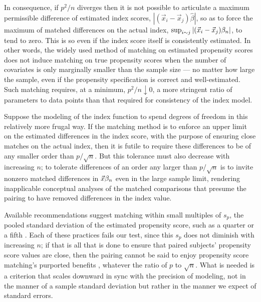 \documentclass{article}
\theoremstyle{remark}
\begin{document}
In consequence, if $p^2/n$ diverges then it is not possible to
articulate a maximum permissible difference of estimated
index scores, $|(\vec{x}_i - \vec{x}_j)\hat\beta|$, so as to force
the maximum of matched differences on the actual index,
$\sup_{i \sim j}|(\vec{x}_i - \vec{x}_j)\beta_{n }|$, to tend to zero. This
is so even if the index score itself is consistently estimated.
In other words, the widely used method of matching on estimated
propensity scores does not induce matching on true propensity scores
when the number of covariates is only marginally smaller than the sample
size --- no matter how large the sample, even if the propensity
specification is correct and well-estimated. Such matching requires, at
a minimum, $p^2/n \downarrow 0$, a more stringent ratio of
parameters to data points than that required for consistency of the
index model.

Suppose the modeling of the index function to spend degrees of freedom in this
relatively more frugal way. If the matching method is to enforce an
upper limit on the estimated differences in the index score, with the purpose of ensuring
close matches on the actual index, then it is futile to require
these differences to be of any smaller order than $p/\sqrt{n}$.  But
this tolerance must also decrease with increasing $n$; to tolerate differences of an order any larger than
$p/\sqrt{n}$ is to invite nonzero matched differences in $\vec{x}\beta_{n }$ even
in the large sample limit, rendering inapplicable conceptual analyses
of the matched comparisons that presume the pairing to have removed
differences in the index value. 

Available recommendations suggest matching within small multiples of
$s_{p}$, the pooled standard deviation of the estimated propensity
score, such as a quarter \citep{rosenbaum:rubi:1985a,rubin:thom:2000}
or a fifth \citep{austin2011optimal,wang2013PScalipers3groups}.  Each
of these practices fails our test, since this $s_{p}$ does not
diminish with increasing $n$; if that is all that is done to ensure
that paired subjects' propensity score values are close, then the
pairing cannot be said to enjoy propensity score matching's purported
benefits \citep{rosenbaum:rubi:1983}, whatever the ratio of $p$ to
$\sqrt{n}$.  What is needed is a criterion that scales downward in
sync with the precision of modeling, not in the manner of a sample
standard deviation but rather in the manner we expect of standard
errors.\nocite{lunt2013PScalipers}
\end{document}
